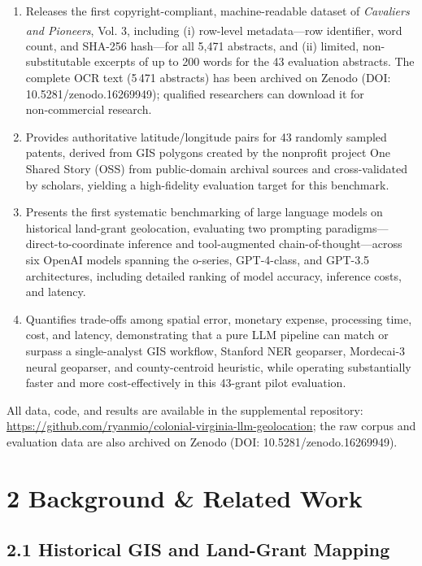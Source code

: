 \documentclass[
  10pt]{article}
\providecommand{\tightlist}{%
  \setlength{\itemsep}{0pt}\setlength{\parskip}{0pt}}
\begin{document}
\begin{enumerate}
\def\labelenumi{\arabic{enumi}.}
\tightlist
\item
  Releases the first copyright-compliant, machine-readable dataset of
  \emph{Cavaliers and Pioneers}, Vol.
  3\textsuperscript{}, including
  (i) row-level metadata---row identifier, word count, and SHA-256
  hash---for all 5,471 abstracts, and (ii) limited, non-substitutable
  excerpts of up to 200 words for the 43 evaluation abstracts. The
  complete OCR text (5\,471 abstracts) has been archived on Zenodo (DOI:
  10.5281/zenodo.16269949); qualified researchers can download it for
  non‑commercial research.
\item
  Provides authoritative latitude/longitude pairs for 43 randomly
  sampled patents, derived from GIS polygons created by the nonprofit
  project One Shared Story (OSS) from public-domain archival sources and
  cross-validated by scholars, yielding a high-fidelity evaluation
  target for this benchmark.
\item
  Presents the first systematic benchmarking of large language models on
  historical land-grant geolocation, evaluating two prompting
  paradigms---direct-to-coordinate inference and tool-augmented
  chain-of-thought---across six OpenAI models spanning the o-series,
  GPT-4-class, and GPT-3.5 architectures, including detailed ranking of
  model accuracy, inference costs, and latency.
\item
  Quantifies trade-offs among spatial error, monetary expense,
  processing time, cost, and latency, demonstrating that a pure LLM
  pipeline can match or surpass a single-analyst GIS workflow, Stanford
  NER geoparser, Mordecai-3 neural geoparser, and county-centroid
  heuristic, while operating substantially faster and more
  cost-effectively in this 43-grant pilot evaluation.
\end{enumerate}

All data, code, and results are available in the supplemental
repository:
\url{https://github.com/ryanmio/colonial-virginia-llm-geolocation}; the
raw corpus and evaluation data are also archived on Zenodo (DOI:
10.5281/zenodo.16269949).

\section{2 Background \& Related Work}\label{background-related-work}

\subsection{2.1 Historical GIS and Land-Grant
Mapping}\label{historical-gis-and-land-grant-mapping}
\end{document}
